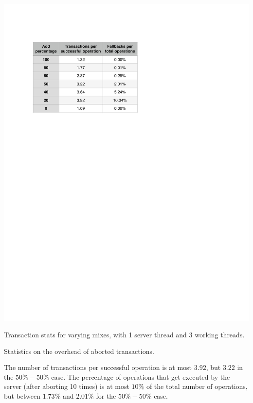 \begin{table}[htb]
\begin{minipage}{.49\textwidth}
  \includegraphics[width=\linewidth]{img/tsx-stat-percents.pdf}
\caption{Transaction stats for varying mixes, with 1 server thread and 3 working threads.}
\label{tbl:tsx-stat2}
\end{minipage}
\caption{Statistics on the overhead of aborted transactions.}
\end{table}

The number of transactions per successful operation is at most $3.92$, but $3.22$ in the $50\%-50\%$ case. The percentage of operations that get executed by the server (after aborting 10 times) is at most $10\%$ of the total number of operations, but between $1.73\%$ and $2.01\%$ for the $50\%-50\%$ case.
